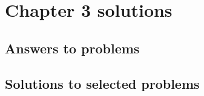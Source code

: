 	\section*{Chapter 3 solutions}
	\label{sec:chapter3sols}	
	{ \footnotesize 

		\subsection*{Answers to problems}
		

		\subsection*{Solutions to selected problems}
		

	}  

